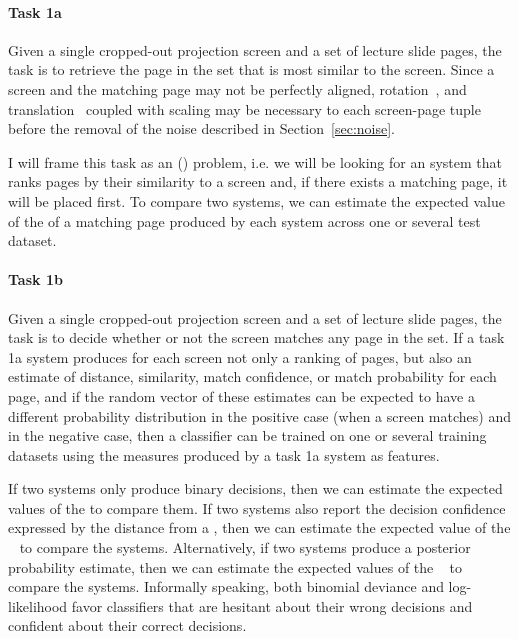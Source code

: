 \paragraph{Task 1a} Given a single cropped-out projection screen and a set of
lecture slide pages, the task is to retrieve the page in the set that is most
similar to the screen. Since a screen and the matching page may not be
perfectly aligned, rotation~\cite{smith1995simple}, and
translation~\cite{sarvaiyaetal09} coupled with scaling may be necessary to
 each screen-page tuple before the removal of the noise
described in Section~\ref{sec:noise}.

I will frame this task as an  () problem,
i.e. we will be looking for an  system that ranks pages by their
similarity to a screen and, if there exists a matching page, it will be placed
first. To compare two systems, we can estimate the expected value of the
 of a matching page produced by each system across one or several
test dataset.

\paragraph{Task 1b} Given a single cropped-out projection screen and a set of
lecture slide pages, the task is to decide whether or not the screen matches
any page in the set.  If a task 1a system produces for each screen not only a
ranking of pages, but also an estimate of distance, similarity, match
confidence, or match probability for each page, and if the random vector of
these estimates can be expected to have a different probability distribution
in the positive case (when a screen matches) and in the negative case, then a
classifier can be trained on one or several training datasets using the
measures produced by a task 1a system as features.

If two systems only produce binary decisions, then we can estimate the expected
values of the  to compare them. If two systems
also report the decision confidence expressed by the distance from a
, then we can estimate the expected value of the
~\cite[sec.~10.6]{friedman2001elements} to compare the
systems. Alternatively, if two systems produce a posterior probability
estimate, then we can estimate the expected values of the
~\cite[sec.~2.6.3]{friedman2001elements} to compare the
systems.
Informally speaking, both binomial deviance and log-likelihood favor
classifiers that are hesitant about their wrong decisions and confident about
their correct decisions.

